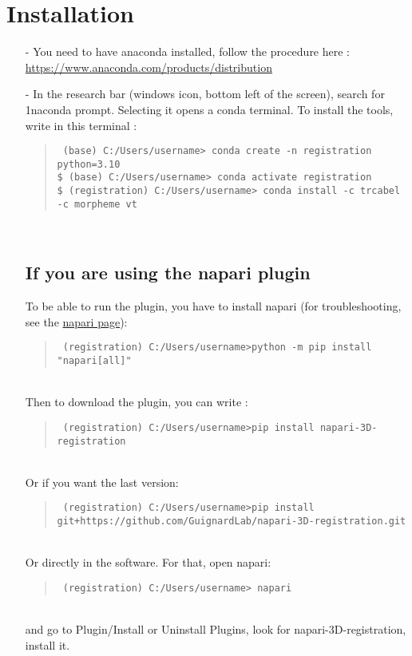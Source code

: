\documentclass[10pt,a4paper]{book}
\newenvironment{code}[1]{\mbox{}\\[1ex]\hspace*{-#1cm}\begin{minipage}{150mm}\begin{quote}\tt}{\end{quote}\end{minipage}\mbox{}\\[1ex]}
\begin{document}
\section{Installation}
\begin{itemize}
\item[-] You need to have anaconda installed, follow the procedure here : \url{https://www.anaconda.com/products/distribution}
\item[-]In the research bar (windows icon, bottom left of the screen), search for 1naconda prompt. Selecting it opens a conda terminal. To install the tools, write in this terminal :
\begin{code}{0.8}
\$ (base) C:/Users/username> conda create -n registration python=3.10 \\
\$ (base) C:/Users/username> conda activate registration \\
\$ (registration) C:/Users/username> conda install -c trcabel -c morpheme vt \\
\end{code}
\subsection{If you are using the napari plugin}
To be able to run the plugin, you have to install napari (for troubleshooting, see the \href{https:/napari.org/stable/}{napari page}):
\begin{code}{0.8}
\$ (registration) C:/Users/username>python -m pip install "napari[all]"
\end{code}
Then to download the plugin, you can write :
\begin{code}{0.8}
\$ (registration) C:/Users/username>pip install napari-3D-registration
\end{code}
Or if you want the last version:
\begin{code}{0.8}
\$ (registration) C:/Users/username>pip install git+https://github.com/GuignardLab/napari-3D-registration.git
\end{code}
Or directly in the software. For that, open napari:
\begin{code}{0.8}
\$ (registration) C:/Users/username> napari
\end{code}
and  go to Plugin/Install or Uninstall Plugins, look for napari-3D-registration, install it. \\


\end{itemize}
\end{document}
